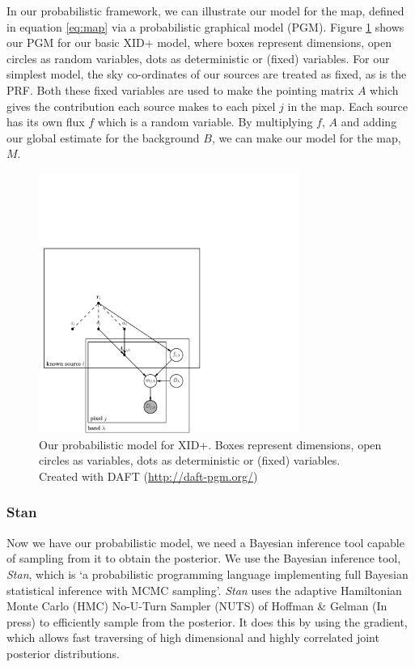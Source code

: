 \documentclass[useAMS,usenatbib]{mn2e}
\begin{document}
In our probabilistic framework, we can illustrate our model for the map, defined in equation \ref{eq:map} via a probabilistic graphical model (PGM). Figure \ref{fig:graph_mod_xid+} shows our PGM for our basic XID+ model, where boxes represent dimensions, open circles as random variables, dots as deterministic or (fixed) variables. For our simplest model, the sky co-ordinates of our sources are treated as fixed, as is the PRF. Both these fixed variables are used to make the pointing matrix $A$ which gives the contribution each source makes to each pixel $j$ in the map. Each source has its own flux $f$ which is a random variable. By multiplying $f$, $A$ and adding our global estimate for the background $B$, we can make our model for the map, $M$. 
\begin{figure}
\includegraphics[width=8.5cm]{./graphical_model.pdf}
\caption{Our probabilistic model for XID+. Boxes represent dimensions, open circles as variables, dots as deterministic or (fixed) variables. Created with DAFT (\url{http://daft-pgm.org/})}\label{fig:graph_mod_xid+}
\end{figure}
 
\subsubsection{Stan}
Now we have our probabilistic model, we need a Bayesian inference tool capable of sampling from it to obtain the posterior. We use the Bayesian inference tool, \textit{Stan}, which is `a probabilistic programming language implementing full Bayesian statistical inference with MCMC sampling'. \textit{Stan} uses the adaptive Hamiltonian Monte Carlo (HMC) No-U-Turn Sampler (NUTS) of Hoffman & Gelman (In press) to efficiently sample from the posterior. It does this by using the gradient, which allows fast traversing of high dimensional and highly correlated joint posterior distributions. 
\end{document}
